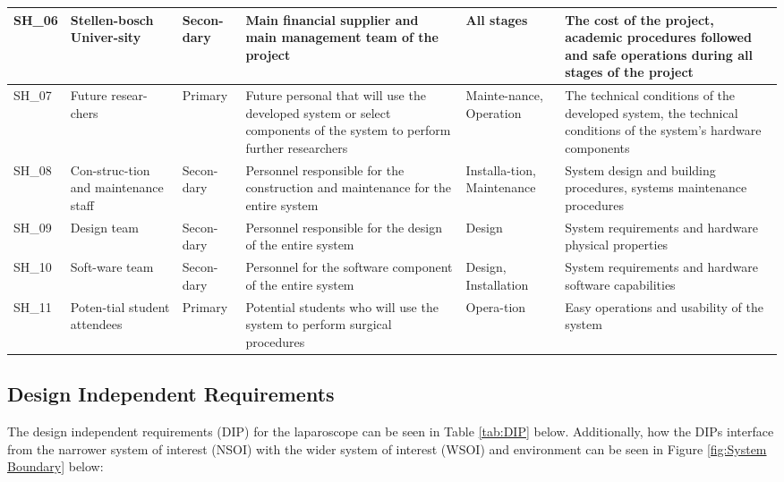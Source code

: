 \begin{longtable}{|p{}|p{}|p{}|p{}|p{}|p{}|}
SH\_06 & 
Stellen-bosch Univer-sity & 
Secon-dary & 
Main financial supplier and main management team of 
the project & 
All stages & 
The cost of the project, academic procedures followed 
and safe operations during all stages of the project \\
\hline

SH\_07 & 
Future resear-chers & 
Primary & 
Future personal that will use the developed system or select 
components of the system to perform further researchers & 
Mainte-nance, Operation & 
The technical conditions of the developed system, the 
technical conditions of the system's hardware components \\
\hline

SH\_08 & 
Con-struc-tion and maintenance staff & 
Secon-dary & 
Personnel responsible for the construction and maintenance 
for the entire system & 
Installa-tion, Maintenance & 
System design and building procedures, systems maintenance 
procedures \\
\hline

SH\_09 & 
Design team & 
Secon-dary & 
Personnel responsible for the design of the entire system & 
Design & 
System requirements and hardware physical properties \\
\hline

SH\_10 & 
Soft-ware team & 
Secon-dary & 
Personnel for the software component of the entire system & 
Design, Installation & 
System requirements and hardware software capabilities \\
\hline

SH\_11 & 
Poten-tial student attendees & 
Primary & 
Potential students who will use the system to perform 
surgical procedures & 
Opera-tion & 
Easy operations and usability of the system \\
\hline

\end{longtable}


\subsection{Design Independent Requirements}

The design independent requirements (DIP) for the laparoscope can be seen in Table \ref{tab:DIP} below. Additionally, how the DIPs interface from the narrower system of interest (NSOI) with the wider system of interest (WSOI) and environment can be seen in Figure \ref{fig:System Boundary} below:

